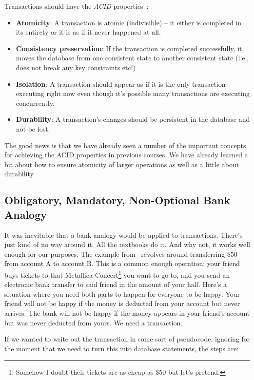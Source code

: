 Transactions should have the \textit{ACID} properties~\cite{fds}:
\begin{itemize}
	\item \textbf{Atomicity}: A transaction is atomic (indivisible) -- it either is completed in its entirety or it is as if it never happened at all.
	\item \textbf{Consistency preservation}: If the transaction is completed successfully, it moves the database from one consistent state to another consistent state (i.e., does not break any key constraints etc!)
	\item \textbf{Isolation}: A transaction should appear as if it is the only transaction executing right now even though it's possible many transactions are executing concurrently.
	\item \textbf{Durability}: A transaction's changes should be persistent in the database and not be lost. 
\end{itemize}

The good news is that we have already seen a number of the important concepts for achieving the ACID properties in previous courses. We have already learned a bit about how to ensure atomicity of larger operations as well as a little about durability.

\subsection*{Obligatory, Mandatory, Non-Optional Bank Analogy}
It was inevitable that a bank analogy would be applied to transactions. There's just kind of no way around it. All the textbooks do it. And why not, it works well enough for our purposes. The example from~\cite{dsc} revolves around transferring \$50 from account A to account B. This is a common enough operation: your friend buys tickets to that Metallica Concert\footnote{Somehow I doubt their tickets are as cheap as \$50 but let's pretend.} you want to go to, and you send an electronic bank transfer to said friend in the amount of your half.  Here's a situation where you need both parts to happen for everyone to be happy. Your friend will not be happy if the money is deducted from your account but never arrives. The bank will not be happy if the money appears in your friend's account but was never deducted from yours. We need a transaction.

If we wanted to write out the transaction in some sort of pseudocode, ignoring for the moment that we need to turn this into database statements, the steps are:

